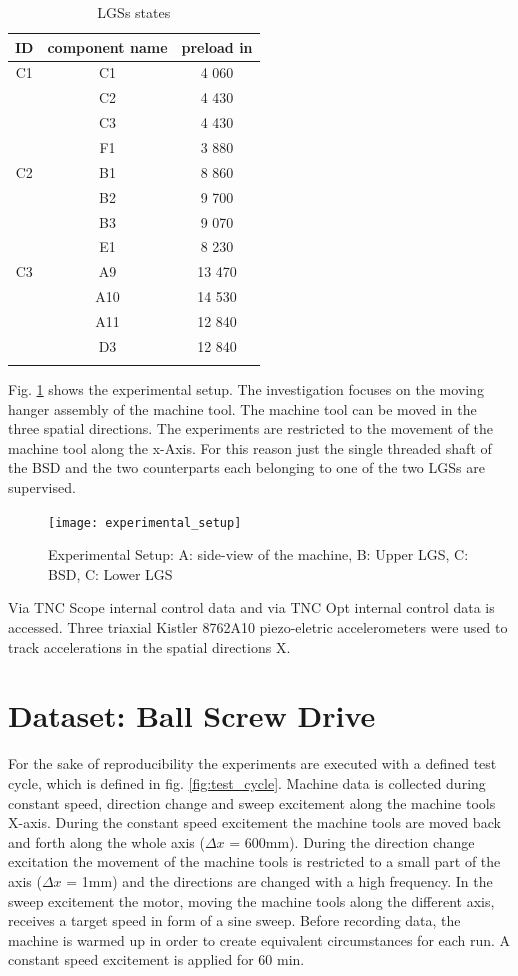 \begin{center}
\begin{longtable}{||c c c||} 
 \hline
 ID & component name & preload in  \\ [0.5ex] 
 \hline\hline
 C1 & C1 & 4 060 \\ 
    & C2 & 4 430 \\ 
    & C3 & 4 430 \\
    & F1 & 3 880 \\ 
 \hline
 C2 & B1 & 8 860 \\ 
    & B2 & 9 700 \\ [1ex] 
    & B3 & 9 070 \\ [1ex]
    & E1 & 8 230 \\ [1ex]
 \hline
 C3 & A9 & 13 470 \\ 
    & A10 & 14 530 \\ [1ex] 
    & A11 & 12 840 \\ [1ex]
    & D3 & 12 840 \\ [1ex]
 \hline
\caption {LGSs states}
\label {tab:LGSs_states}
\end{longtable}
\end{center}

Fig. \ref{fig:experimental_setup} shows the experimental setup. The investigation focuses on the moving hanger assembly of the machine tool. The machine tool can be moved in the three spatial directions. The experiments are restricted to the movement of the machine tool along the x-Axis. For this reason just the single threaded shaft of the BSD and the two counterparts each belonging to one of the two LGSs are supervised.

\begin{figure}[htpb]
  \centering
  \texttt{[image: experimental\_setup]}
  \caption {Experimental Setup: A: side-view of the machine, B: Upper LGS, C: BSD, C: Lower LGS}
  \label{fig:experimental_setup}
\end{figure}


 Via TNC Scope internal control data and via TNC Opt internal control data is accessed. Three triaxial Kistler 8762A10 piezo-eletric accelerometers were used to track accelerations in the spatial directions X.

\section{Dataset: Ball Screw Drive}
For the sake of reproducibility the experiments are executed with a defined test cycle, which is defined in fig. \ref{fig:test_cycle}. Machine data is collected during constant speed, direction change and sweep excitement along the machine tools X-axis. During the constant speed excitement the machine tools are moved back and forth along the whole axis ($\Delta x$ = 600mm). During the direction change excitation the movement of the machine tools is restricted to a small part of the axis ($\Delta x$ = 1mm) and the directions are changed with a high frequency. In the sweep excitement the motor, moving the machine tools along the different axis, receives a target speed in form of a sine sweep. Before recording data, the machine is warmed up in order to create equivalent circumstances for each run. A constant speed excitement is applied for 60 min. 

